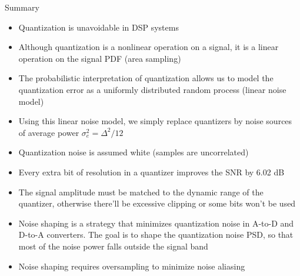 \documentclass[10pt]{beamer}
\begin{document}
%
\begin{frame}{Summary}
\begin{itemize}
	\item Quantization is unavoidable in DSP systems
	\item Although quantization is a nonlinear operation on a signal, it is a linear operation on the signal PDF (area sampling)
	\item The probabilistic interpretation of quantization allows us to model the quantization error as a uniformly distributed random process (linear noise model)
	\item Using this linear noise model, we simply replace quantizers by noise sources of average power $\sigma_e^2 = \Delta^2/12$
	\item Quantization noise is assumed white (samples are uncorrelated)
	\item Every extra bit of resolution in a quantizer improves the SNR by 6.02 dB
	\item The signal amplitude must be matched to the dynamic range of the quantizer, otherwise there'll be excessive clipping or some bits won't be used
	\item Noise shaping is a strategy that minimizes quantization noise in A-to-D and D-to-A converters. The goal is to shape the quantization noise PSD, so that most of the noise power falls outside the signal band
	\item Noise shaping requires oversampling to minimize noise aliasing
\end{itemize}
\end{frame}
\end{document}
